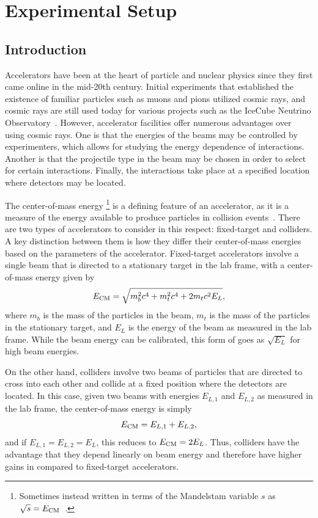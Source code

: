 
\chapter{Experimental Setup}
\label{chap:exp}

\section{Introduction}

Accelerators have been at the heart of particle and nuclear physics since they first came online in the mid-20th century.
Initial experiments that established the existence of familiar particles such as muons and pions utilized cosmic rays, and cosmic rays are still used today for various projects such as the IceCube Neutrino Observatory~\cite{Abbasi_2009}.
However, accelerator facilities offer numerous advantages over using cosmic rays.
One is that the energies of the beams may be controlled by experimenters, which allows for studying the energy dependence of interactions.
Another is that the projectile type in the beam may be chosen in order to select for certain interactions.
Finally, the interactions take place at a specified location where detectors may be located.

The center-of-mass energy \ECM\footnote{Sometimes instead written in terms of the Mandelstam variable $s$ as $\sqrt{s}=E_\mathrm{CM}$~\cite{Perelstein_2011}.} is a defining feature of an accelerator, as it is a measure of the energy available to produce particles in collision events~\cite{martin2008particle}.
There are two types of accelerators to consider in this respect: fixed-target and colliders.
A key distinction between them is how they differ their center-of-mass energies based on the parameters of the accelerator.
Fixed-target accelerators involve a single beam that is directed to a stationary target in the lab frame, with a center-of-mass energy given by
\begin{equation}
  E_\mathrm{CM}=\sqrt{m_b^2c^4+m_t^2c^4+2m_tc^2E_L},
\end{equation}
where $m_b$ is the mass of the particles in the beam, $m_t$ is the mass of the particles in the stationary target, and $E_L$ is the energy of the beam as measured in the lab frame.
While the beam energy can be calibrated, this form of \ECM goes as $\sqrt{E_L}$ for high beam energies.

On the other hand, colliders involve two beams of particles that are directed to cross into each other and collide at a fixed position where the detectors are located.
In this case, given two beams with energies $E_{L,1}$ and $E_{L,2}$ as measured in the lab frame, the center-of-mass energy is simply
\begin{equation}
  E_\mathrm{CM}=E_{L,1}+E_{L,2},
\end{equation}
and if $E_{L,1}=E_{L,2}=E_L$, this reduces to $E_\mathrm{CM}=2E_L$.
Thus, colliders have the advantage that they depend linearly on beam energy and therefore have higher gains in \ECM compared to fixed-target accelerators.

